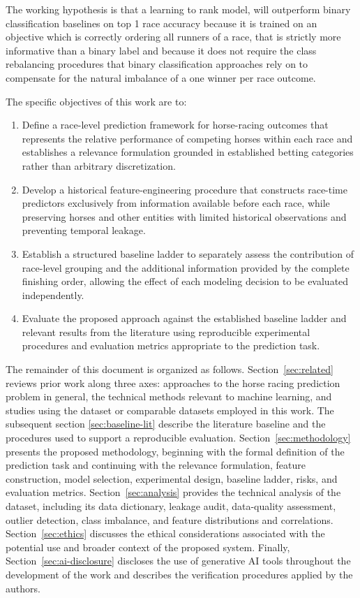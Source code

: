 The working hypothesis is that a learning to rank model, will outperform binary classification baselines on top 1 race accuracy because it is trained on an objective which is correctly ordering all runners of a race, that is strictly more informative than a binary label and because it does not require the class rebalancing procedures that binary classification approaches rely on to compensate for the natural imbalance of a one winner per race outcome.

The specific objectives of this work are to:
\begin{enumerate}
    \item Define a race-level prediction framework for horse-racing
    outcomes that represents the relative performance of competing horses
    within each race and establishes a relevance formulation grounded in
    established betting categories rather than arbitrary discretization.

    \item Develop a historical feature-engineering procedure that
    constructs race-time predictors exclusively from information available
    before each race, while preserving horses and other entities with limited
    historical observations and preventing temporal leakage.

    \item Establish a structured baseline ladder to separately assess
    the contribution of race-level grouping and the additional information
    provided by the complete finishing order, allowing the effect of each
    modeling decision to be evaluated independently.

    \item Evaluate the proposed approach against the established
    baseline ladder and relevant results from the literature using reproducible
    experimental procedures and evaluation metrics appropriate to the
    prediction task.
\end{enumerate}

The remainder of this document is organized as follows. Section~\ref{sec:related} reviews prior work along three axes: approaches to the horse racing prediction problem in general, the technical methods relevant to machine learning, and studies using the dataset or comparable datasets employed in this work. The subsequent section \ref{sec:baseline-lit} describe the literature baseline and the procedures used to support a reproducible evaluation. Section~\ref{sec:methodology} presents the proposed methodology, beginning with the formal definition of the prediction task and continuing with the relevance formulation, feature construction, model selection, experimental design, baseline ladder, risks, and evaluation metrics. Section~\ref{sec:analysis} provides the technical analysis of the dataset, including its data dictionary, leakage audit, data-quality assessment, outlier detection, class imbalance, and feature distributions and correlations. Section~\ref{sec:ethics} discusses the ethical considerations associated with the potential use and broader context of the proposed system. Finally, Section~\ref{sec:ai-disclosure} discloses the use of generative AI tools throughout the development of the work and describes the verification procedures applied by the authors.